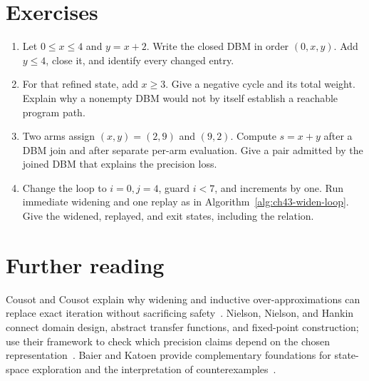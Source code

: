 \section{Exercises}
\label{sec:ch43-exercises}

\begin{enumerate}
\item \label{ex:ch43-close}
Let $0\leq x\leq4$ and $y=x+2$.
Write the closed DBM in order $(0,x,y)$.
Add $y\leq4$, close it, and identify every changed entry.
\item \label{ex:ch43-cycle}
For that refined state, add $x\geq3$.
Give a negative cycle and its total weight.
Explain why a nonempty DBM would not by itself establish a reachable program path.
\item \label{ex:ch43-partition}
Two arms assign $(x,y)=(2,9)$ and $(9,2)$.
Compute $s=x+y$ after a DBM join and after separate per-arm evaluation.
Give a pair admitted by the joined DBM that explains the precision loss.
\item \label{ex:ch43-loop}
Change the loop to $i=0,j=4$, guard $i<7$, and increments by one.
Run immediate widening and one replay as in Algorithm~\ref{alg:ch43-widen-loop}.
Give the widened, replayed, and exit states, including the relation.
\end{enumerate}

\section{Further reading}
\label{sec:ch43-reading}

Cousot and Cousot explain why widening and inductive over-approximations can replace exact iteration without sacrificing safety~\cite{cousot-1977-abstract}.
Nielson, Nielson, and Hankin connect domain design, abstract transfer functions, and fixed-point construction; use their framework to check which precision claims depend on the chosen representation~\cite{nielson-1999-principles}.
Baier and Katoen provide complementary foundations for state-space exploration and the interpretation of counterexamples~\cite{baier-2008-model-checking}.

